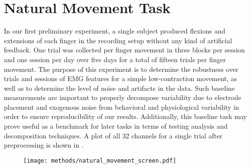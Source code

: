 \documentclass[../main.tex]{subfiles}
\begin{document}
\section{Natural Movement Task}

In our first preliminary experiment, a single subject produced flexions and extensions of each finger in the recording setup without any kind of artificial feedback. One trial was collected per finger movement in three blocks per session and one session per day over five days for a total of fifteen trials per finger movement. The purpose of this experiment is to determine the robustness over trials and sessions of EMG features for a simple low-contraction movement, as well as to determine the level of noise and artifacts in the data. Such baseline measurements are important to properly decompose variability due to electrode placement and exogenous noise from behavioral and physiological variability in order to ensure reproducibility of our results. Additionally, this baseline task may prove useful as a benchmark for later tasks in terms of testing analysis and decomposition techniques. A plot of all 32 channels for a single trial after preprocessing is shown in .


\begin{figure}
\centering
  \texttt{[image: methods/natural\_movement\_screen.pdf]}
  \caption[Movement task visual feedback]{}\label{fig:movement_task_screen}
\end{figure}
\end{document}
